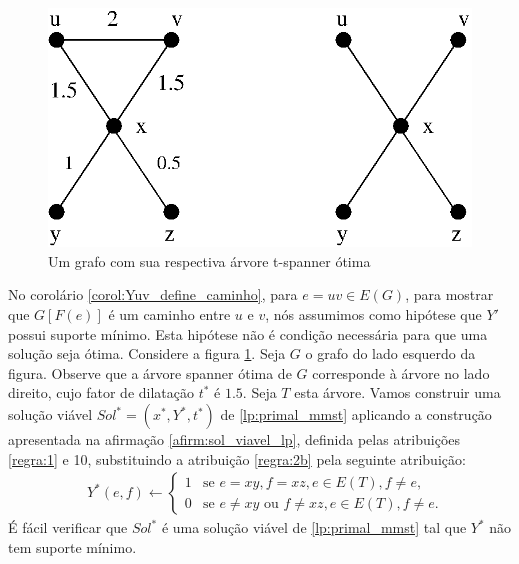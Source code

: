 \documentclass[11pt,reqno]{amsart}
\begin{document}
\begin{figure}[t] 
\centering
\includegraphics[scale=0.45]{figuras/exemplo_Y_minimal}
\caption{Um grafo com sua respectiva árvore t-spanner ótima}
\label{fig:exemplo_Y_minimal}
\end{figure}


No corolário \ref{corol:Yuv_define_caminho}, para $e = uv \in E(G)$, 
para mostrar que $G[F(e)]$ 
é um caminho entre $u$ e $v$, nós assumimos como hipótese que $Y'$ possui 
suporte mínimo. Esta hipótese não é condição necessária para que uma solução 
seja ótima.
Considere a figura \ref{fig:exemplo_Y_minimal}. Seja $G$ o grafo do lado 
esquerdo da figura. Observe que a árvore spanner ótima de $G$ corresponde à 
árvore no lado direito, cujo fator de dilatação $t^*$ é $1.5$. Seja 
$T$ esta árvore. Vamos 
construir uma solução viável $Sol^* = (x^*,Y^*,t^*)$ de \ref{lp:primal_mmst} 
aplicando a construção apresentada na afirmação \ref{afirm:sol_viavel_lp}, 
definida pelas atribuições \ref{regra:1} e 10, 
substituindo a atribuição \ref{regra:2b} pela seguinte atribuição:
\begin{align*}
&Y^*(e,f)\leftarrow
\begin{cases}
    1& \text{se $e = xy, f = xz, e \in E(T), f \neq e,$}\\
    0& \text{se $e \neq xy$ ou $f \neq xz, e \in E(T), f \neq e.$}
\end{cases}
\end{align*}
É fácil verificar que $Sol^*$ é uma solução viável de \ref{lp:primal_mmst} 
tal que $Y^*$ não tem suporte mínimo.

\end{document}
